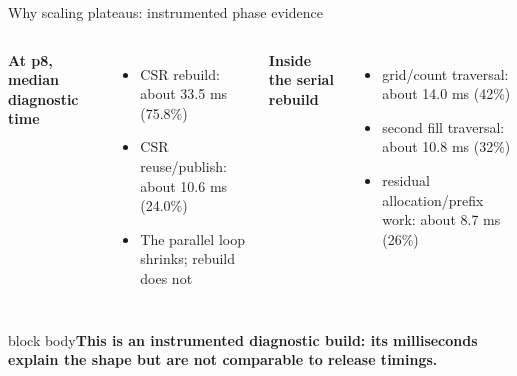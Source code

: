 \documentclass[aspectratio=169,10pt]{beamer}
\newcommand{\claim}[1]{\begin{beamercolorbox}[rounded=true,sep=.65em,wd=\linewidth]{block body}\centering\bfseries\color{moss}#1\end{beamercolorbox}}
\begin{document}
\begin{frame}{Why scaling plateaus: instrumented phase evidence}
\begin{columns}[T,onlytextwidth]
\textbf{At p8, median diagnostic time}
\begin{itemize}\itemsep.4em
  \item CSR rebuild: about 33.5 ms (75.8\%)
  \item CSR reuse/publish: about 10.6 ms (24.0\%)
  \item The parallel loop shrinks; rebuild does not
\end{itemize}
\textbf{Inside the serial rebuild}
\begin{itemize}\itemsep.4em
  \item grid/count traversal: about 14.0 ms (42\%)
  \item second fill traversal: about 10.8 ms (32\%)
  \item residual allocation/prefix work: about 8.7 ms (26\%)
\end{itemize}
\end{columns}
\vspace{.7em}
\vspace{.35em}
\claim{This is an instrumented diagnostic build: its milliseconds explain the shape but are not comparable to release timings.}
\end{frame}
\end{document}

